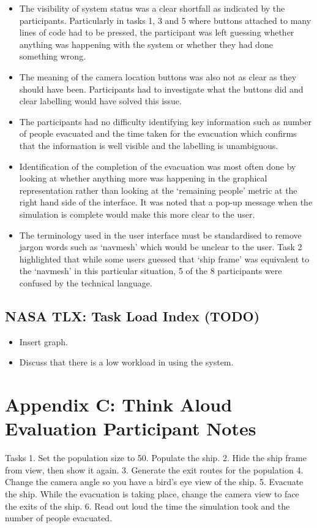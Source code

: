 \documentclass{article}
\begin{document}
\begin{itemize}
\item The visibility of system status was a clear shortfall as indicated by the participants. Particularly in tasks 1, 3 and 5 where buttons attached to many lines of code had to be pressed, the participant was left guessing whether anything was happening with the system or whether they had done something wrong.
\item The meaning of the camera location buttons was also not as clear as they should have been. Participants had to investigate what the buttons did and clear labelling would have solved this issue.
\item The participants had no difficulty identifying key information such as number of people evacuated and the time taken for the evacuation which confirms that the information is well visible and the labelling is unambiguous.
\item Identification of the completion of the evacuation was most often done by looking at whether anything more was happening in the graphical representation rather than looking at the `remaining people' metric at the right hand side of the interface. It was noted that a pop-up message when the simulation is complete would make this more clear to the user.
\item The terminology used in the user interface must be standardised to remove jargon words such as ‘navmesh’ which would be unclear to the user. Task 2 highlighted that while some users guessed that ‘ship frame’ was equivalent to the ‘navmesh’ in this particular situation, 5 of the 8 participants were confused by the technical language. 
\end{itemize}

\subsection{NASA TLX: Task Load Index (TODO)}
\begin{itemize}
\item Insert graph.
\item Discuss that there is a low workload in using the system.
\end{itemize}

\section{Appendix C: Think Aloud Evaluation Participant Notes}
Tasks
1. Set the population size to 50. Populate the ship.
2. Hide the ship frame from view, then show it again.
3. Generate the exit routes for the population
4. Change the camera angle so you have a bird’s eye view of the ship.
5. Evacuate the ship. While the evacuation is taking place, change the camera view to face the exits of the ship.
6. Read out loud the time the simulation took and the number of people evacuated.
\end{document}
